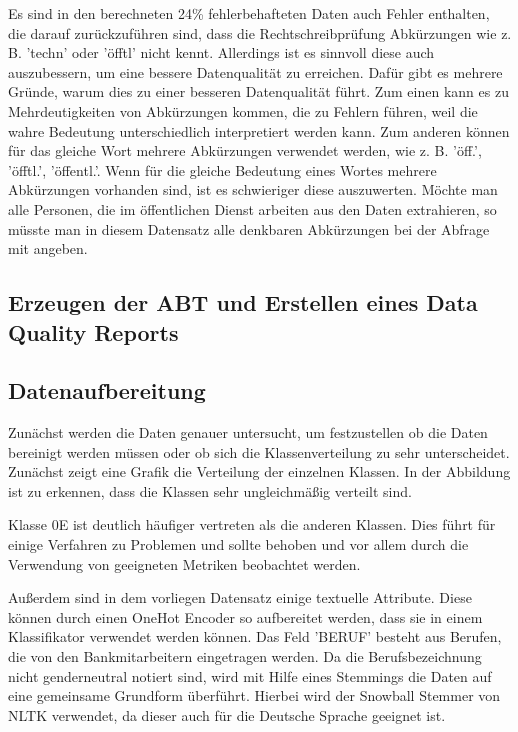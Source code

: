 Es sind in den berechneten 24\% fehlerbehafteten Daten auch Fehler enthalten, die darauf zurückzuführen sind, dass die Rechtschreibprüfung Abkürzungen wie z. B. 'techn' oder 'öfftl' nicht kennt. 
Allerdings ist es sinnvoll diese auch auszubessern, um eine bessere Datenqualität zu erreichen.
Dafür gibt es mehrere Gründe, warum dies zu einer besseren Datenqualität führt.
Zum einen kann es zu Mehrdeutigkeiten von Abkürzungen kommen, die zu Fehlern führen, weil die wahre Bedeutung unterschiedlich interpretiert werden kann. 
Zum anderen können für das gleiche Wort mehrere Abkürzungen verwendet werden, wie z. B. 'öff.', 'öfftl.', 'öffentl.'.
Wenn für die gleiche Bedeutung eines Wortes mehrere Abkürzungen vorhanden sind, ist es schwieriger diese auszuwerten.
Möchte man alle Personen, die im öffentlichen Dienst arbeiten aus den Daten extrahieren, so müsste man in diesem Datensatz alle denkbaren Abkürzungen bei der Abfrage mit angeben. 




\subsection{Erzeugen der ABT und Erstellen eines Data Quality Reports}

\subsection{Datenaufbereitung }
Zunächst werden die Daten genauer untersucht, um festzustellen ob die Daten bereinigt werden müssen oder ob sich die Klassenverteilung zu sehr unterscheidet. 
Zunächst zeigt eine Grafik die Verteilung der einzelnen Klassen. 
In der Abbildung ist zu erkennen, dass die Klassen sehr ungleichmäßig verteilt sind.

Klasse 0E ist deutlich häufiger vertreten als die anderen Klassen. 
Dies führt für einige Verfahren zu Problemen und sollte behoben und vor allem durch die Verwendung von geeigneten Metriken beobachtet werden.


Außerdem sind in dem vorliegen Datensatz einige textuelle Attribute.
Diese können durch einen OneHot Encoder so aufbereitet werden, dass sie in einem Klassifikator verwendet werden können.
Das Feld 'BERUF' besteht aus Berufen, die von den Bankmitarbeitern eingetragen werden.
Da die Berufsbezeichnung nicht genderneutral notiert sind, wird mit Hilfe eines Stemmings die Daten auf eine gemeinsame Grundform überführt.
Hierbei wird der Snowball Stemmer von NLTK verwendet, da dieser auch für die Deutsche Sprache geeignet ist.

